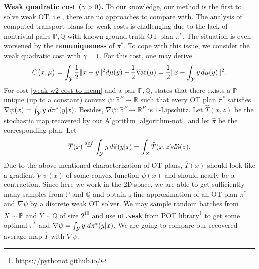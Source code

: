 \documentclass{article} %
\begin{document}
\textbf{Weak quadratic cost ($\gamma>0$).} To our knowledge, \underline{our method is the first to solve weak OT}, i.e., \underline{there are no approaches to compare with}. The analysis of computed transport plans for weak costs is challenging due to the lack of nontrivial pairs $\mathbb{P},\mathbb{Q}$ with known ground truth OT plan $\pi^{*}$. The situation is even worsened by the \textbf{nonuniqueness} of $\pi^{*}$. To cope with this issue, we consider the weak quadratic cost with $\gamma=1$. For this cost, one may derive
\begin{equation}
    C\big(x,\mu\big)=
    \int_{\mathcal{Y}}\frac{1}{2}\|x-y\|^{2}d\mu(y)-\frac{1}{2}\text{Var}(\mu)=\frac{1}{2}\|x-\int_{\mathcal{Y}}y\hspace{0.5mm}d\mu(y)\|^{2}.
    \label{weak-w2-cost-to-mean}
\end{equation}
For cost \eqref{weak-w2-cost-to-mean} and a pair $\mathbb{P},\mathbb{Q}$, \citep[Theorem 1.2]{gozlan2020mixture} states that there exists a $\mathbb{P}$-unique (up to a constant) convex $\psi:\mathbb{R}^{P}\rightarrow\mathbb{R}$ such that every OT plan $\pi^{*}$ satisfies $\nabla\psi(x)=\int_{\mathcal{Y}}y \hspace{1mm} d\pi^{*}(y|x)$. Besides, $\nabla\psi:\mathbb{R}^{P}\rightarrow\mathbb{R}^{P}$ is $1$-Lipschitz. Let $\widehat{T}(x,z)$ be the stochastic map recovered by our Algorithm \ref{algorithm-not}, and let $\widehat{\pi}$ be the corresponding plan. Let \begin{equation}\overline{T}(x)\stackrel{def}{=}\int_{\mathcal{Y}}y\hspace{0.5mm}d\widehat{\pi}(y|x)=\int_{\mathcal{Z}}\widehat{T}(x,z)d\mathbb{S}(z).
\label{barycenteric-projection}
\end{equation}
Due to the above mentioned characterization of OT plans, $\overline{T}(x)$ should look like a gradient $\nabla\psi(x)$ of some convex function $\psi(x)$ and should nearly be a contraction. Since here we work in the 2D space, we are able to get sufficiently many samples from $\mathbb{P}$ and $\mathbb{Q}$ and obtain a fine approximation of an OT plan $\pi^{*}$ and $\nabla\psi$ by a discrete weak OT solver. We may sample random batches from $X\sim\mathbb{P}$ and $Y\sim\mathbb{Q}$ of size $2^{10}$ and use \texttt{ot.weak} from POT library\footnote{https://pythonot.github.io/} to get some optimal $\pi^{*}$ and $\nabla\psi=\int_{\mathcal{Y}}y \hspace{1mm} d\pi^{*}(y|x)$. We are going to compare our recovered average map $\overline{T}$ with $\nabla\psi$.
\end{document}
